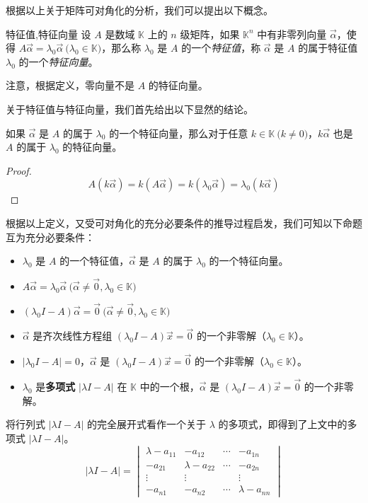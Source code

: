 根据以上关于矩阵可对角化的分析，我们可以提出以下概念。

\begin{definition}{特征值,特征向量}
	设 $A$ 是数域 $\mathbb K$ 上的 $n$ 级矩阵，如果 $\mathbb K^n$ 中有非零列向量 $\vec \alpha$，使得 $A \vec \alpha = \lambda_0 \vec \alpha \pod{\lambda_0 \in \mathbb K}$，那么称 $\lambda_0$ 是 $A$ 的一个\emph{特征值}，称 $\vec \alpha$ 是 $A$ 的属于特征值 $\lambda_0$ 的一个\emph{特征向量}。
\end{definition}

注意，根据定义，零向量不是 $A$ 的特征向量。

关于特征值与特征向量，我们首先给出以下显然的结论。

\begin{theorem}
	如果 $\vec \alpha$ 是 $A$ 的属于 $\lambda_0$ 的一个特征向量，那么对于任意 $k \in \mathbb K \pod{k \ne 0}$，$k \vec \alpha$ 也是 $A$ 的属于 $\lambda_0$ 的特征向量。
\end{theorem}

\begin{proof}
	$$
	A(k \vec \alpha) = k(A \vec \alpha) = k(\lambda_0 \vec \alpha) = \lambda_0 (k \vec \alpha)
	$$
\end{proof}

根据以上定义，又受可对角化的充分必要条件的推导过程启发，我们可知以下命题互为充分必要条件：

\begin{itemize}
	\item $\lambda_0$ 是 $A$ 的一个特征值，$\vec \alpha$ 是 $A$ 的属于 $\lambda_0$ 的一个特征向量。
	\item $A \vec \alpha = \lambda_0 \vec \alpha \pod{\vec \alpha \ne \vec 0, \lambda_0 \in \mathbb K}$
	\item $(\lambda_0 I - A) \vec \alpha = \vec 0 \pod{\vec \alpha \ne \vec 0, \lambda_0 \in \mathbb K}$
	\item $\vec \alpha$ 是齐次线性方程组 $(\lambda_0 I - A) \vec x = \vec 0$ 的一个非零解（$\lambda_0 \in \mathbb K$）。
	\item $|\lambda_0 I - A| = 0$，$\vec \alpha$ 是 $(\lambda_0 I - A) \vec x = \vec 0$ 的一个非零解（$\lambda_0 \in \mathbb K$）。
	\item $\lambda_0$ 是\textbf{多项式} $|\lambda I - A|$ 在 $\mathbb K$ 中的一个根，$\vec \alpha$ 是 $(\lambda_0 I - A) \vec x = \vec 0$ 的一个非零解。
\end{itemize}

将行列式 $|\lambda I - A|$ 的完全展开式看作一个关于 $\lambda$ 的多项式，即得到了上文中的多项式 $|\lambda I - A|$。
$$
|\lambda I - A| =
\begin{vmatrix}
\lambda - a_{11} & -a_{12} & \cdots & -a_{1n}
\\
-a_{21} & \lambda - a_{22} & \cdots & -a_{2n}
\\
\vdots & \vdots & & \vdots
\\
-a_{n1} & -a_{n2} & \cdots & \lambda - a_{nn}
\end{vmatrix}
$$

